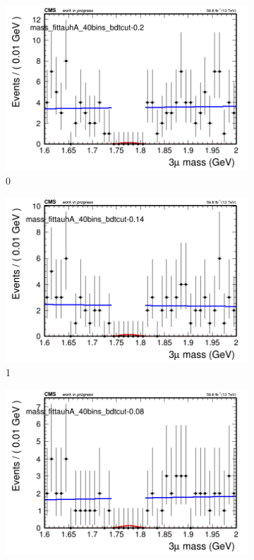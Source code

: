 \begin{figure}[h!]
    \centering
    \begin{subfigure}{0.2\textwidth}
        \includegraphics[width=\textwidth]{power_law/plots/tauhA/massfit_tauhA_40bins_bdtcut-0.2.png}
        \caption{0}
    \end{subfigure}
    \begin{subfigure}{0.2\textwidth}
        \includegraphics[width=\textwidth]{power_law/plots/tauhA/massfit_tauhA_40bins_bdtcut-0.14.png}
        \caption{1}
    \end{subfigure}
    \begin{subfigure}{0.2\textwidth}
        \includegraphics[width=\textwidth]{power_law/plots/tauhA/massfit_tauhA_40bins_bdtcut-0.08.png}

\end{subfigure}
\end{figure}
